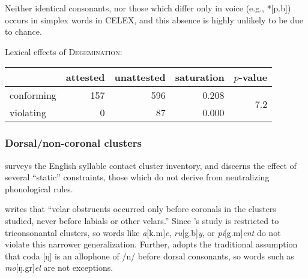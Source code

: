 Neither identical consonants, nor those which differ only in voice (e.g., *[p.b]) occurs in simplex words in CELEX, and this absence is highly unlikely to be due to chance.

\ex Lexical effects of \textsc{Degemination}: \vspace{6pt} \\
\begin{tabular}{l r r r r}
\toprule
           & attested & unattested & saturation & $p$-value \\
\midrule
conforming & 157 & 596 & 0.208 & \multirow{2}{*}{7.2\e{-09}}\\
violating  &   0 &  87 & 0.000 \\
\bottomrule
\end{tabular}
\xe


\subsubsection{Dorsal/non-coronal clusters}

\citet{Pierrehumbert1994} surveys the English syllable contact cluster inventory, and discerns the effect of several ``static'' constraints, those which do not derive from neutralizing phonological rules. 

\citet[][173]{Pierrehumbert1994} writes that ``velar obstruents occurred only before coronals in the clusters studied, never before labials or other velars.'' Since \citeauthor{Pierrehumbert1994}'s study is restricted to triconsonantal clusters, so words like \emph{a}[k.m]\emph{e}, \emph{ru}[g.b]\emph{y}, or \emph{pi}[g.m]\emph{ent} do not violate this narrower generalization. Further, \citeauthor{Pierrehumbert1994} adopts the traditional assumption \citep[e.g.,][66f.]{Borowsky1986} that coda [ŋ] is an allophone of /n/ before dorsal consonants, so words such as \emph{mo}[ŋ.gr]\emph{el} are not exceptions. 

